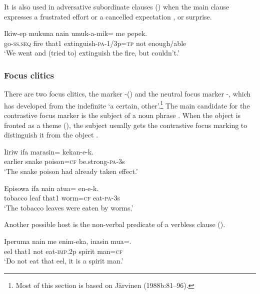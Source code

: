 It is also used in adversative subordinate clauses () when the main clause expresses a frustrated effort or a cancelled expectation , or surprise.

\ea%
\label{ex:3:x1399}
\gll Ikiw-ep mukuna nain umuk-a-mik= me pepek. \\
go-\textsc{ss}.\textsc{seq} fire that1 extinguish-\textsc{pa}-1/3p=\textsc{tp} not enough/able\\
\glt`We went and (tried to) extinguish the fire, but couldn't.'
\z

\subsubsection{Focus clitics}\label{sec:3.12.7.2}
{}
There are two focus clitics, the  marker -() and the neutral focus marker -, which has developed from the indefinite  `a certain, other'.\footnote{Most of this section is based on J\"arvinen (1988b:81--96).} The main candidate for the contrastive focus marker is the subject of a noun phrase . When the object is fronted as a theme (), the subject usually gets the contrastive focus marking to distinguish it from the object . 

\ea%
\label{ex:3:x781}
\gll Iiriw ifa marasin= kekan-e-k. \\
earlier snake poison=\textsc{cf} be.strong-\textsc{pa}-3s\\
\glt`The snake poison had already taken effect.'
\z

\ea%
\label{ex:3:x782}
\gll Episowa ifa nain atua= en-e-k. \\
tobacco leaf that1 worm=\textsc{cf} eat-\textsc{pa}-3s\\
\glt`The tobacco leaves were eaten by worms.'
\z

\noindent Another possible host is the non-verbal predicate of a verbless clause  ().

\ea%
\label{ex:3:x783}
\gll Iperuma nain me enim-eka, inasin mua=. \\
eel that1 not eat-\textsc{imp}.2p spirit man=\textsc{cf}\\
\glt`Do not eat that eel, it is a spirit man.'
\z

